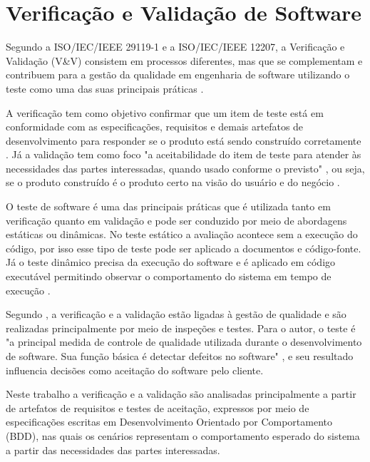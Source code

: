 \section{Verificação e Validação de Software}

Segundo a ISO/IEC/IEEE 29119-1 e a ISO/IEC/IEEE 12207, a Verificação e Validação (V\&V) consistem em processos diferentes, mas que se complementam e contribuem para a gestão da qualidade em engenharia de software utilizando o teste como uma das suas principais práticas \cite{iso29119_1_2022,iso12207_2026}.

A verificação tem como objetivo confirmar que um item de teste está em conformidade com as especificações, requisitos e demais artefatos de desenvolvimento para responder se o produto está sendo construído corretamente \cite{iso29119_1_2022,iso12207_2026}. Já a validação tem como foco "a aceitabilidade do item de teste para atender às necessidades das partes interessadas, quando usado conforme o previsto" \cite[p.~16, tradução nossa]{iso29119_1_2022}, ou seja, se o produto construído é o produto certo na visão do usuário e do negócio \cite{iso12207_2026}.

O teste de software é uma das principais práticas que é utilizada tanto em verificação quanto em validação e pode ser conduzido por meio de abordagens estáticas ou dinâmicas. No teste estático a avaliação acontece sem a execução do código, por isso esse tipo de teste pode ser aplicado a documentos e código-fonte. Já o teste dinâmico precisa da execução do software e é aplicado em código executável permitindo observar o comportamento do sistema em tempo de execução \cite{iso29119_1_2022}.

Segundo , a verificação e a validação estão ligadas à gestão de qualidade e são realizadas principalmente por meio de inspeções e testes. Para o autor, o teste é "a principal medida de controle de qualidade utilizada durante o desenvolvimento de software. Sua função básica é detectar defeitos no software" \cite[p.~19, tradução nossa]{jalote2005}, e seu resultado influencia decisões como aceitação do software pelo cliente. 

Neste trabalho a verificação e a validação são analisadas principalmente a partir de artefatos de requisitos e testes de aceitação, expressos por meio de especificações escritas em Desenvolvimento Orientado por Comportamento (BDD), nas quais os cenários representam o comportamento esperado do sistema a partir das necessidades das partes interessadas.

